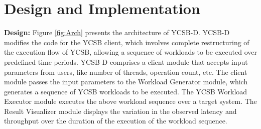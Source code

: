 \documentclass{vldb}
\begin{document}
\section{Design and Implementation}
 \textbf{Design:} Figure \ref{fig:Arch} presents the architecture of YCSB-D. YCSB-D modifies the code for the YCSB client, which involves complete restructuring of the execution flow of YCSB, allowing a sequence of workloads to be executed over  predefined time periods. YCSB-D comprises a client module that accepts input parameters from users, like number of threads, operation count, etc. The client module passes the input parameters to the Workload Generator module, which generates a sequence of YCSB workloads to be executed. The YCSB Workload Executor module executes the above workload sequence over a target system. The Result Visualizer module displays the variation in the observed latency and throughput over the duration of the execution of the workload sequence.
%
\end{document}
